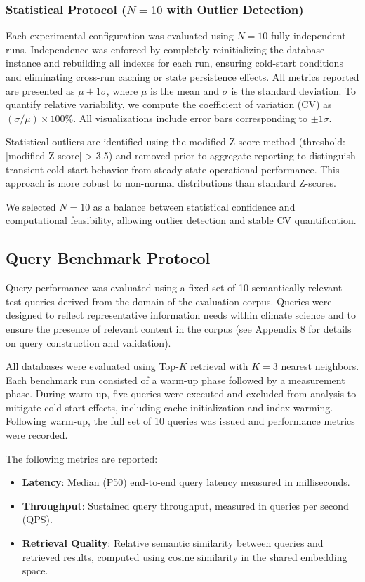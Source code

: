 \documentclass{article}
\begin{document}
\subsubsection{Statistical Protocol ($N = 10$ with Outlier Detection)}
Each experimental configuration was evaluated using $N = 10$ fully independent runs. Independence was enforced by completely reinitializing the database instance and rebuilding all indexes for each run, ensuring cold-start conditions and eliminating cross-run caching or state persistence effects. All metrics reported are presented as $\mu \pm 1\sigma$, where $\mu$ is the mean and $\sigma$ is the standard deviation. To quantify relative variability, we compute the coefficient of variation (CV) as $(\sigma / \mu) \times 100\%$. All visualizations include error bars corresponding to $\pm 1\sigma$.

Statistical outliers are identified using the modified Z-score method (threshold: |modified Z-score| > 3.5) and removed prior to aggregate reporting to distinguish transient cold-start behavior from steady-state operational performance. This approach is more robust to non-normal distributions than standard Z-scores.

We selected $N = 10$ as a balance between statistical confidence and computational feasibility, allowing outlier detection and stable CV quantification.

\subsection{Query Benchmark Protocol}
Query performance was evaluated using a fixed set of 10 semantically relevant test queries derived from the domain of the evaluation corpus. Queries were designed to reflect representative information needs within climate science and to ensure the presence of relevant content in the corpus (see Appendix 8 for details on query construction and validation).

All databases were evaluated using Top-$K$ retrieval with $K = 3$ nearest neighbors. Each benchmark run consisted of a warm-up phase followed by a measurement phase. During warm-up, five queries were executed and excluded from analysis to mitigate cold-start effects, including cache initialization and index warming. Following warm-up, the full set of 10 queries was issued and performance metrics were recorded.

The following metrics are reported:

\begin{itemize}
\item \textbf{Latency}: Median (P50) end-to-end query latency measured in milliseconds.
\item \textbf{Throughput}: Sustained query throughput, measured in queries per second (QPS).
\item \textbf{Retrieval Quality}: Relative semantic similarity between queries and retrieved results, computed using cosine similarity in the shared embedding space.
\end{itemize}
\end{document}
